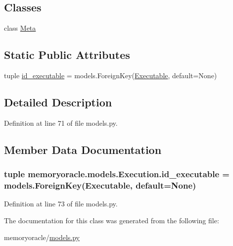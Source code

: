 \subsection*{Classes}
\begin{DoxyCompactItemize}
\item 
class \hyperlink{classmemoryoracle_1_1models_1_1Execution_1_1Meta}{Meta}
\end{DoxyCompactItemize}
\subsection*{Static Public Attributes}
\begin{DoxyCompactItemize}
\item 
tuple \hyperlink{classmemoryoracle_1_1models_1_1Execution_a126d2c8175a946f7b6b1276f4a58e432}{id\+\_\+executable} = models.\+Foreign\+Key(\hyperlink{classmemoryoracle_1_1models_1_1Executable}{Executable}, default=None)
\end{DoxyCompactItemize}


\subsection{Detailed Description}


Definition at line 71 of file models.\+py.



\subsection{Member Data Documentation}
\hypertarget{classmemoryoracle_1_1models_1_1Execution_a126d2c8175a946f7b6b1276f4a58e432}{}
\subsubsection[{id\+\_\+executable}]{\setlength{\rightskip}{0pt plus 5cm}tuple memoryoracle.\+models.\+Execution.\+id\+\_\+executable = models.\+Foreign\+Key({\bf Executable}, default=None)\hspace{0.3cm}{\ttfamily [static]}}\label{classmemoryoracle_1_1models_1_1Execution_a126d2c8175a946f7b6b1276f4a58e432}


Definition at line 73 of file models.\+py.



The documentation for this class was generated from the following file\+:\begin{DoxyCompactItemize}
\item 
memoryoracle/\hyperlink{models_8py}{models.\+py}\end{DoxyCompactItemize}
